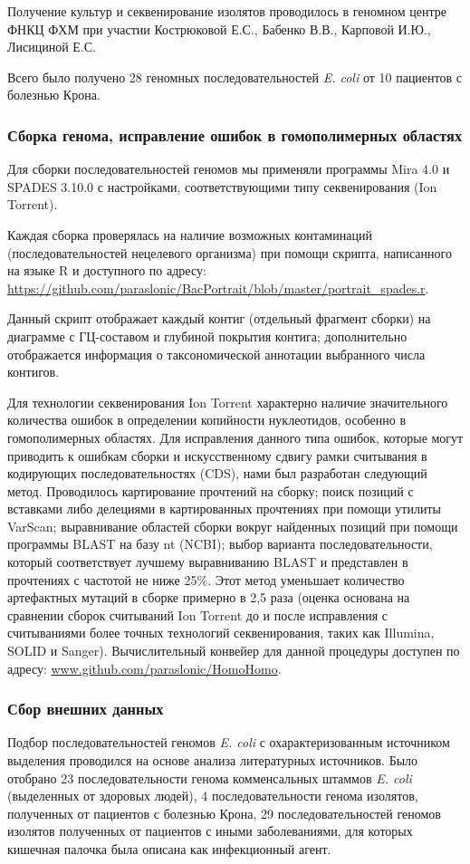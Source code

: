 Получение культур и секвенирование изолятов  проводилось в геномном центре ФНКЦ ФХМ при участии Кострюковой Е.С., Бабенко В.В., Карповой И.Ю., Лисициной Е.С.

Всего было получено 28 геномных последовательностей \textit{E. coli} от 10 пациентов с болезнью Крона.

\subsubsection*{Сборка генома, исправление ошибок в гомополимерных областях}
Для сборки последовательностей геномов мы применяли программы Mira 4.0 и SPADES 3.10.0 с настройками, соответствующими типу секвенирования (Ion Torrent).

Каждая сборка проверялась на наличие возможных контаминаций (последовательностей нецелевого организма) при помощи скрипта, написанного на языке R и доступного по адресу: \url{https://github.com/paraslonic/BacPortrait/blob/master/portrait\_spades.r}. 

Данный скрипт отображает каждый контиг (отдельный фрагмент сборки) на диаграмме с ГЦ-составом и глубиной покрытия контига; дополнительно отображается информация о таксономической аннотации выбранного числа контигов. 

Для технологии секвенирования Ion Torrent характерно наличие значительного количества ошибок в определении копийности нуклеотидов, особенно в гомополимерных областях. Для исправления данного типа ошибок, которые могут приводить к ошибкам сборки и искусственному сдвигу рамки считывания в кодирующих последовательностях (CDS), нами был разработан следующий метод. Проводилось картирование прочтений на сборку; поиск позиций с вставками либо делециями в картированных прочтениях при помощи утилиты VarScan; выравнивание областей сборки вокруг найденных позиций при помощи программы BLAST на базу nt (NCBI); выбор варианта последовательности, который соответствует лучшему выравниванию BLAST и представлен в прочтениях с частотой не ниже 25\%. Этот метод уменьшает количество артефактных мутаций в сборке примерно в 2,5 раза (оценка основана на сравнении сборок считываний Ion Torrent до и после исправления с считываниями более точных технологий секвенирования, таких как Illumina, SOLID и Sanger). Вычислительный конвейер для данной процедуры доступен по адресу: \url{www.github.com/paraslonic/HomoHomo}.


\subsubsection{Сбор внешних данных}
Подбор последовательностей геномов \textit{E. coli} с охарактеризованным источником выделения проводился на основе анализа литературных источников. Было отобрано 23 последовательности генома комменсальных штаммов \textit{E. coli} (выделенных от здоровых людей), 4 последовательности генома изолятов, полученных от пациентов с болезнью Крона, 29 последовательностей геномов изолятов полученных от пациентов с иными заболеваниями, для которых кишечная палочка была описана как инфекционный агент.

